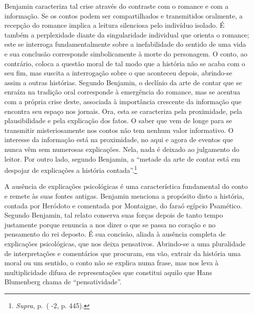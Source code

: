 Benjamin caracteriza tal crise através do contraste com o romance e com
a informação. Se os contos podem ser compartilhados e transmitidos
oralmente, a recepção do romance implica a leitura silenciosa pelo
indivíduo isolado. É também a perplexidade diante da singularidade
individual que orienta o romance; este se interroga fundamentalmente
sobre a inefabilidade do sentido de uma vida e sua conclusão corresponde
simbolicamente à morte do personagem. O conto, ao contrário, coloca a
questão moral de tal modo que a história não se acaba com o seu fim, mas
suscita a interrogação sobre o que aconteceu depois, abrindo-se assim a
outras histórias. Segundo Benjamin, o declínio da arte de contar que se
enraíza na tradição oral corresponde à emergência do romance, mas se
acentua com a própria crise deste, associada à importância crescente da
informação que encontra seu espaço nos jornais. Ora, esta se caracteriza
pela proximidade, pela plausibilidade e pela explicação dos fatos. O
saber que vem de longe para se transmitir misteriosamente nos contos não
tem nenhum valor informativo. O interesse da informação está na
proximidade, no aqui e agora de eventos que nunca vêm sem numerosas
explicações. Nela, nada é deixado ao julgamento do leitor. Por outro
lado, segundo Benjamin, a ``metade da arte de contar está em despojar de
explicações a história contada''.\footnote{\emph{Supra}, p.\,\pageref{supra3} ( -2,
  p. 445).}

A ausência de explicações psicológicas é uma característica fundamental
do conto e remete às suas fontes antigas. Benjamin menciona a propósito
disto a história, contada por Heródoto e comentada por Montaigne, do
faraó egípcio Psamético. Segundo Benjamin, tal relato conserva suas
forças depois de tanto tempo justamente porque renuncia a nos dizer o
que se passa no coração e no pensamento do rei deposto. É sua concisão,
aliada à ausência completa de explicações psicológicas, que nos deixa
pensativos. Abrindo-se a uma pluralidade de interpretações e comentários
que procuram, em vão, extrair da história uma moral ou um sentido, o
conto não se explica numa frase, mas nos leva à multiplicidade difusa de
representações que constitui aquilo que Hans Blumenberg chama de
``pensatividade''.

